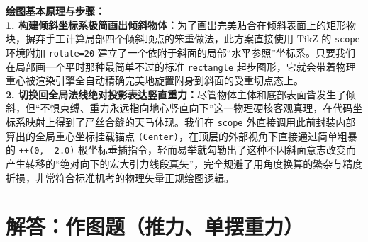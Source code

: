 \documentclass[12pt, a4paper]{ctexrep}
\begin{document}
\vspace{0.6cm}

{\small\color{blue!70!black}
\textbf{绘图基本原理与步骤：}\\
\textbf{1. 构建倾斜坐标系极简画出倾斜物体：}为了画出完美贴合在倾斜表面上的矩形物块，摒弃手工计算局部四个倾斜顶点的笨重做法，此方案直接使用 TikZ 的 \texttt{scope} 环境附加 \texttt{rotate=20} 建立了一个依附于斜面的局部“水平参照”坐标系。只要我们在局部画一个平时那种最简单不过的标准 \texttt{rectangle} 起步图形，它就会带着物理重心被渲染引擎全自动精确完美地旋置附身到斜面的受重切点态上。\\
\textbf{2. 切换回全局法线绝对投影表达竖直重力：}尽管物体主体和底部表面皆发生了倾斜，但“不惧束缚、重力永远指向地心竖直向下”这一物理硬核客观真理，在代码坐标系映射上得到了严丝合缝的天马体现。我们在 \texttt{scope} 外直接调用此前封装内部算出的全局重心坐标挂载锚点 \texttt{(Center)}，在顶层的外部视角下直接通过简单粗暴的 \texttt{++(0, -2.0)} 极坐标垂插指令，轻而易举就勾勒出了这种不因斜面意志改变而产生转移的“绝对向下的宏大引力线段真矢”，完全规避了用角度换算的繁杂与精度折损，非常符合标准机考的物理矢量正规绘图逻辑。
}


\section{解答：作图题（推力、单摆重力）}

\vspace{0.6cm}
\end{document}
